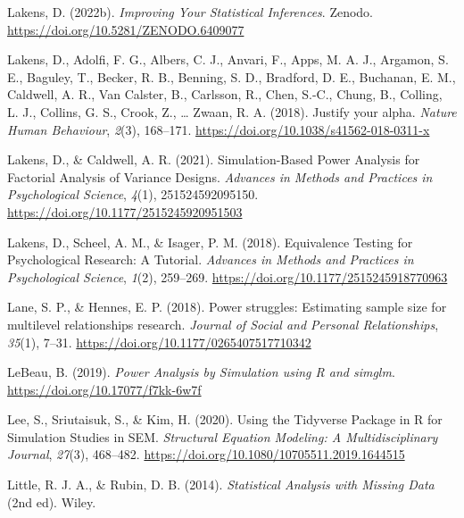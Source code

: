 \documentclass[
  man,
  floatsintext,
  longtable,
  a4paper,
  nolmodern,
  notxfonts,
  notimes,
  colorlinks=true,linkcolor=blue,citecolor=blue,urlcolor=blue]{apa7}
\newlength{\cslhangindent}
\newenvironment{CSLReferences}[2] %
 {\begin{list}{}{%
  \setlength{\itemindent}{0pt}
  \setlength{\leftmargin}{0pt}
  \setlength{\parsep}{0pt}
  \ifodd #1
   \setlength{\leftmargin}{\cslhangindent}
   \setlength{\itemindent}{-1\cslhangindent}
  \fi
  \setlength{\itemsep}{#2\baselineskip}}}
 {\end{list}}
\begin{document}
\begin{CSLReferences}{1}{0}
Lakens, D. (2022b). \emph{Improving {Your Statistical Inferences}}.
Zenodo. \url{https://doi.org/10.5281/ZENODO.6409077}

Lakens, D., Adolfi, F. G., Albers, C. J., Anvari, F., Apps, M. A. J.,
Argamon, S. E., Baguley, T., Becker, R. B., Benning, S. D., Bradford, D.
E., Buchanan, E. M., Caldwell, A. R., Van Calster, B., Carlsson, R.,
Chen, S.-C., Chung, B., Colling, L. J., Collins, G. S., Crook, Z.,
\ldots{} Zwaan, R. A. (2018). Justify your alpha. \emph{Nature Human
Behaviour}, \emph{2}(3), 168--171.
\url{https://doi.org/10.1038/s41562-018-0311-x}

Lakens, D., \& Caldwell, A. R. (2021). Simulation-{Based Power Analysis}
for {Factorial Analysis} of {Variance Designs}. \emph{Advances in
Methods and Practices in Psychological Science}, \emph{4}(1),
251524592095150. \url{https://doi.org/10.1177/2515245920951503}

Lakens, D., Scheel, A. M., \& Isager, P. M. (2018). Equivalence
{Testing} for {Psychological Research}: {A Tutorial}. \emph{Advances in
Methods and Practices in Psychological Science}, \emph{1}(2), 259--269.
\url{https://doi.org/10.1177/2515245918770963}

Lane, S. P., \& Hennes, E. P. (2018). Power struggles: {Estimating}
sample size for multilevel relationships research. \emph{Journal of
Social and Personal Relationships}, \emph{35}(1), 7--31.
\url{https://doi.org/10.1177/0265407517710342}

LeBeau, B. (2019). \emph{Power {Analysis} by {Simulation} using {R} and
simglm}. \url{https://doi.org/10.17077/f7kk-6w7f}

Lee, S., Sriutaisuk, S., \& Kim, H. (2020). Using the {Tidyverse
Package} in {R} for {Simulation Studies} in {SEM}. \emph{Structural
Equation Modeling: A Multidisciplinary Journal}, \emph{27}(3), 468--482.
\url{https://doi.org/10.1080/10705511.2019.1644515}

Little, R. J. A., \& Rubin, D. B. (2014). \emph{Statistical {Analysis}
with {Missing Data}} (2nd ed). Wiley.


\end{CSLReferences}
\end{document}
